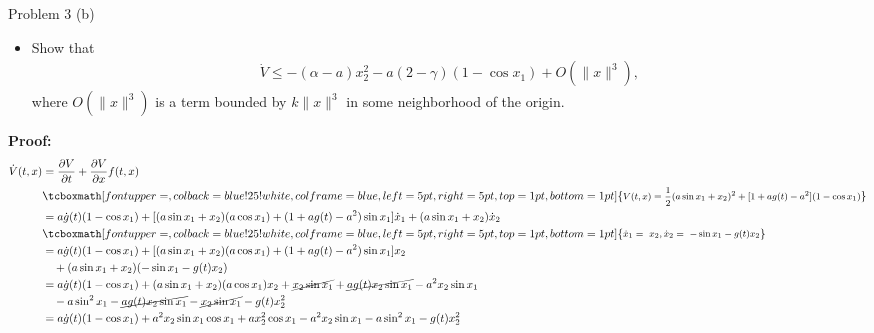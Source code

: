 \documentclass[8pt]{beamer}
\begin{document}
\begin{frame}[t]{Problem 3 (b)}
  \begin{block}{}
\begin{itemize}
\item[(b)] Show that
\begin{align*}
\dot V\leq-(\alpha-a)x_2^2-a(2-\gamma)(1-\cos x_1)+O(\|x\|^3),
\end{align*}
where $O(\|x\|^3)$ is a term bounded by $k\|x\|^3$ in some neighborhood of the origin.
\end{itemize}
\end{block}
{\bf Proof:}
\begin{align*}
  \dot{V}(t,x) &= \frac{\partial V}{\partial t} + \frac{\partial V}{\partial x}f(t,x) \\
  &\tcboxmath[fontupper=\footnotesize,colback=blue!25!white,colframe=blue,left=5pt,right=5pt,top=1pt,bottom=1pt]{\begin{aligned}
    V(t,x)=\frac{1}{2}(a\sin x_1+x_2)^2+[1+ag(t)-a^2](1-\cos x_1)
    \end{aligned}}\\
  &=a\dot{g}(t)(1-\cos x_1)+[(a\sin x_1+x_2)(a \cos x_1)+(1+ag(t)-a^2)\sin x_1]\dot x_1 + (a \sin x_1 +x_2)\dot x_2\\
  &  \tcboxmath[fontupper=\footnotesize,colback=blue!25!white,colframe=blue,left=5pt,right=5pt,top=1pt,bottom=1pt]{ \begin{aligned}
      \dot x_1=~x_2,
      \dot x_2=~-\sin x_1-g(t)x_2
      \end{aligned}    }  \\
  &= a\dot{g}(t)(1-\cos x_1)+[(a\sin x_1+x_2)(a \cos x_1)+(1+ag(t)-a^2)\sin x_1]x_2\\
  &\quad + (a \sin x_1 +x_2)(-\sin x_1-g(t)x_2)\\
  &=a\dot{g}(t)(1-\cos x_1)+(a\sin x_1+x_2)(a \cos x_1)x_2+\cancel{x_2\sin x_1}+\cancel{ag(t)x_2\sin x_1}-a^2x_2\sin x_1\\
  &\quad -a\sin^2x_1-\cancel{ag(t)x_2\sin x_1}-\cancel{x_2\sin x_1}-g(t)x_2^2\\
  &=a\dot{g}(t)(1-\cos x_1)+a^2x_2\sin x_1\cos x_1+ax_2^2\cos x_1-a^2x_2\sin x_1-a\sin^2x_1-g(t)x_2^2
\end{align*}
\end{frame}
\end{document}
